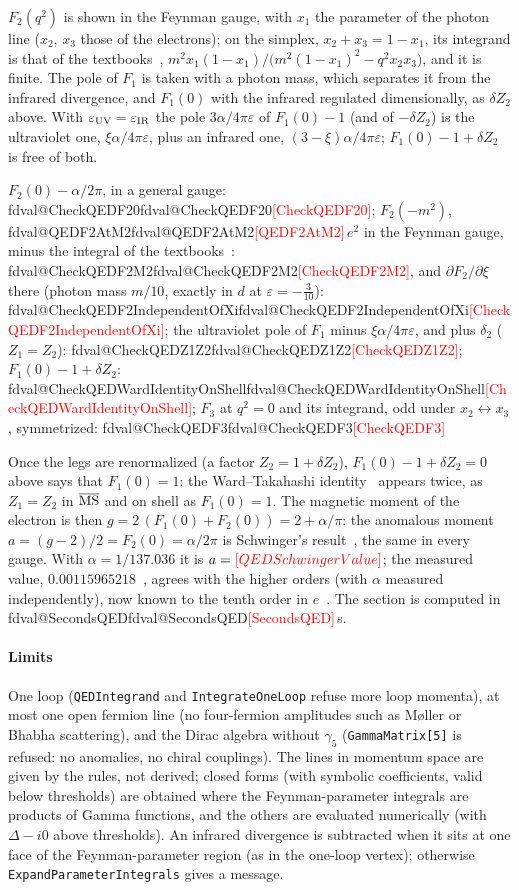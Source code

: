 \documentclass[11pt,a4paper]{article}
\makeatletter
\newcommand{\pkg}[1]{\texttt{#1}}
\newcommand{\val}[1]{\ifcsname fdval@#1\endcsname\csname fdval@#1\endcsname\else\textcolor{red}{[#1]}\fi}
\makeatother
\begin{document}
$F_2(q^2)$ is shown in the Feynman gauge, with $x_1$ the parameter of the photon line ($x_2$, $x_3$ those of the
electrons); on the simplex, $x_2+x_3=1-x_1$, its integrand is that of the textbooks~\cite[section~6.3]{PeskinSchroeder},
\mbox{$m^2x_1(1-x_1)/\bigl(m^2(1-x_1)^2-q^2x_2x_3\bigr)$}, and it is finite. The pole of $F_1$ is
taken with a photon mass, which separates it from the infrared divergence, and $F_1(0)$ with the infrared regulated
dimensionally, as $\delta Z_2$ above. With $\varepsilon_{\rm UV}=\varepsilon_{\rm IR}$ the pole $3\alpha/4\pi\varepsilon$ of
$F_1(0)-1$ (and of $-\delta Z_2$) is the ultraviolet one, $\xi\alpha/4\pi\varepsilon$, plus an infrared one,
$(3-\xi)\alpha/4\pi\varepsilon$; $F_1(0)-1+\delta Z_2$ is free of both.
\begin{result}
$F_2(0)-\alpha/2\pi$, in a general gauge: \val{CheckQEDF20}; $F_2(-m^2)$, \val{QEDF2AtM2}$\,e^2$ in the Feynman gauge, minus the
integral of the textbooks~\cite[section~6.3]{PeskinSchroeder}: \val{CheckQEDF2M2}, and $\partial F_2/\partial\xi$ there (photon
mass $m/10$, exactly in $d$ at $\varepsilon=-\frac3{10}$): \val{CheckQEDF2IndependentOfXi}; the ultraviolet pole of $F_1$ minus
$\xi\alpha/4\pi\varepsilon$, and plus $\delta_2$ ($Z_1=Z_2$): \val{CheckQEDZ1Z2}; $F_1(0)-1+\delta Z_2$: \val{CheckQEDWardIdentityOnShell};
$F_3$ at $q^2=0$ and its integrand, odd under $x_2\leftrightarrow x_3$, symmetrized: \val{CheckQEDF3}
\end{result}
Once the legs are renormalized (a factor $Z_2=1+\delta Z_2$), $F_1(0)-1+\delta Z_2=0$ above says that $F_1(0)=1$: the
Ward--Takahashi identity~\cite{Ward1950,Takahashi1957} appears twice, as $Z_1=Z_2$ in $\overline{\rm MS}$ and on shell as
$F_1(0)=1$. The magnetic moment of the
electron is then $g=2\,(F_1(0)+F_2(0))=2+\alpha/\pi$: the anomalous moment $a=(g-2)/2=F_2(0)=\alpha/2\pi$ is Schwinger's
result~\cite{Schwinger1948}, the same in every gauge. With $\alpha=1/137.036$ it is $a=\val{QEDSchwingerValue}$; the
measured value, $0.00115965218$~\cite{FanMyersSukraGabrielse2023}, agrees with the higher orders (with $\alpha$ measured
independently), now known to the tenth order in $e$~\cite{AoyamaKinoshitaNio2019}. The section is computed in
\val{SecondsQED}\,s.

\paragraph{Limits} One loop (\pkg{QEDIntegrand} and \pkg{IntegrateOneLoop} refuse more loop momenta), at most one
open fermion line (no four-fermion amplitudes such as M{\o}ller or Bhabha scattering), and the Dirac algebra without
$\gamma_5$ (\pkg{GammaMatrix[5]} is refused: no anomalies, no chiral couplings). The lines in momentum space are given by
the rules, not derived; closed forms (with symbolic coefficients, valid below thresholds) are obtained where the
Feynman-parameter integrals are products of Gamma functions, and the others are evaluated numerically (with $\Delta-i0$
above thresholds). An infrared divergence is subtracted when it sits at one face of the Feynman-parameter region (as in
the one-loop vertex); otherwise \pkg{ExpandParameterIntegrals} gives a message.
\end{document}
